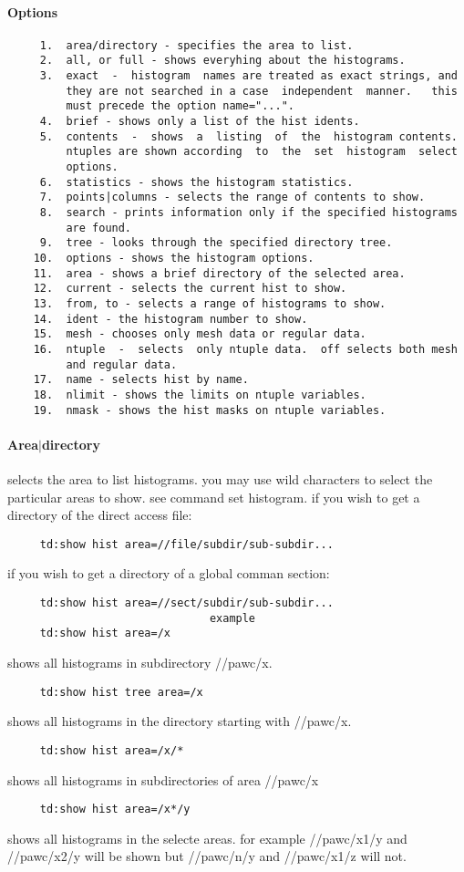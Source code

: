 \paragraph{Options}
\begin{verbatim}
     1.  area/directory - specifies the area to list.  
     2.  all, or full - shows everyhing about the histograms.  
     3.  exact  -  histogram  names are treated as exact strings, and
         they are not searched in a case  independent  manner.   this
         must precede the option name="...".  
     4.  brief - shows only a list of the hist idents.  
     5.  contents  -  shows  a  listing  of  the  histogram contents.
         ntuples are shown according  to  the  set  histogram  select
         options.  
     6.  statistics - shows the histogram statistics.  
     7.  points|columns - selects the range of contents to show.  
     8.  search - prints information only if the specified histograms
         are found.  
     9.  tree - looks through the specified directory tree.  
    10.  options - shows the histogram options.  
    11.  area - shows a brief directory of the selected area.  
    12.  current - selects the current hist to show.  
    13.  from, to - selects a range of histograms to show.  
    14.  ident - the histogram number to show.  
    15.  mesh - chooses only mesh data or regular data.  
    16.  ntuple  -  selects  only ntuple data.  off selects both mesh
         and regular data.  
    17.  name - selects hist by name.  
    18.  nlimit - shows the limits on ntuple variables.  
    19.  nmask - shows the hist masks on ntuple variables.  
\end{verbatim}
\paragraph{Area$|$directory}
selects  the area to list histograms.  you may use wild characters to
select the particular areas to show.  see command set histogram.   if
you wish to get a directory of the direct access file:  
\begin{verbatim}
     td:show hist area=//file/subdir/sub-subdir...  
\end{verbatim}
if you wish to get a directory of a global comman section:  
\begin{verbatim}
     td:show hist area=//sect/subdir/sub-subdir...  
                               example
     td:show hist area=/x 
\end{verbatim}
shows all histograms in subdirectory //pawc/x.  
\begin{verbatim}
     td:show hist tree area=/x 
\end{verbatim}
shows all histograms in the directory starting with //pawc/x.  
\begin{verbatim}
     td:show hist area=/x/* 
\end{verbatim}
shows all histograms in subdirectories of area //pawc/x 
\begin{verbatim}
     td:show hist area=/x*/y 
\end{verbatim}
shows  all  histograms in the selecte areas.  for example //pawc/x1/y
and //pawc/x2/y will be shown but  //pawc/n/y  and  //pawc/x1/z  will
not.  
